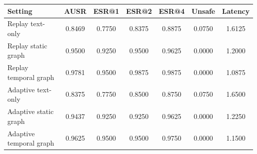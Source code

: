 \begin{tabular}{lcccccc}
\toprule
Setting & AUSR & ESR@1 & ESR@2 & ESR@4 & Unsafe & Latency \\
\midrule
Replay text-only & 0.8469 & 0.7750 & 0.8375 & 0.8875 & 0.0750 & 1.6125 \\
Replay static graph & 0.9500 & 0.9250 & 0.9500 & 0.9625 & 0.0000 & 1.2000 \\
Replay temporal graph & 0.9781 & 0.9500 & 0.9875 & 0.9875 & 0.0000 & 1.0875 \\
\midrule
Adaptive text-only & 0.8375 & 0.7750 & 0.8500 & 0.8750 & 0.0750 & 1.6500 \\
Adaptive static graph & 0.9437 & 0.9250 & 0.9250 & 0.9625 & 0.0000 & 1.2250 \\
Adaptive temporal graph & 0.9625 & 0.9500 & 0.9500 & 0.9750 & 0.0000 & 1.1500 \\
\bottomrule
\end{tabular}
